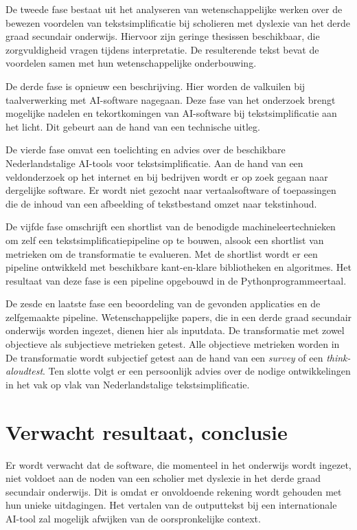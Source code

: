 De tweede fase bestaat uit het analyseren van wetenschappelijke werken over de bewezen voordelen van tekstsimplificatie bij scholieren met dyslexie van het derde graad secundair onderwijs. Hiervoor zijn geringe thesissen beschikbaar, die zorgvuldigheid vragen tijdens interpretatie. De resulterende tekst bevat de voordelen samen met hun wetenschappelijke onderbouwing.

De derde fase is opnieuw een beschrijving. Hier worden de valkuilen bij taalverwerking met AI-software nagegaan. Deze fase van het onderzoek brengt mogelijke nadelen en tekortkomingen van AI-software bij tekstsimplificatie aan het licht. Dit gebeurt aan de hand van een technische uitleg.

De vierde fase omvat een toelichting en advies over de beschikbare Nederlandstalige AI-tools voor tekstsimplificatie. Aan de hand van een veldonderzoek op het internet en bij bedrijven wordt er op zoek gegaan naar dergelijke software. Er wordt niet gezocht naar vertaalsoftware of toepassingen die de inhoud van een afbeelding of tekstbestand omzet naar tekstinhoud.

De vijfde fase omschrijft een shortlist van de benodigde machineleertechnieken om zelf een tekstsimplificatiepipeline op te bouwen, alsook een shortlist van metrieken om de transformatie te evalueren. Met de shortlist wordt er een pipeline ontwikkeld met beschikbare kant-en-klare bibliotheken en algoritmes. Het resultaat van deze fase is een pipeline opgebouwd in de Pythonprogrammeertaal. 

De zesde en laatste fase een beoordeling van de gevonden applicaties en de zelfgemaakte pipeline. Wetenschappelijke papers, die in een derde graad secundair onderwijs worden ingezet, dienen hier als inputdata. De transformatie met zowel objectieve als subjectieve metrieken getest. Alle objectieve metrieken worden in  De transformatie wordt subjectief getest aan de hand van een \textit{survey} of een \textit{think-aloudtest}. Ten slotte volgt er een persoonlijk advies over de nodige ontwikkelingen in het vak op vlak van Nederlandstalige tekstsimplificatie.

\section{Verwacht resultaat, conclusie}
\label{sec:verwachte_resultaten}

Er wordt verwacht dat de software, die momenteel in het onderwijs wordt ingezet, niet voldoet aan de noden van een scholier met dyslexie in het derde graad secundair onderwijs. Dit is omdat er onvoldoende rekening wordt gehouden met hun unieke uitdagingen. Het vertalen van de outputtekst bij een internationale AI-tool zal mogelijk afwijken van de oorspronkelijke context. 

